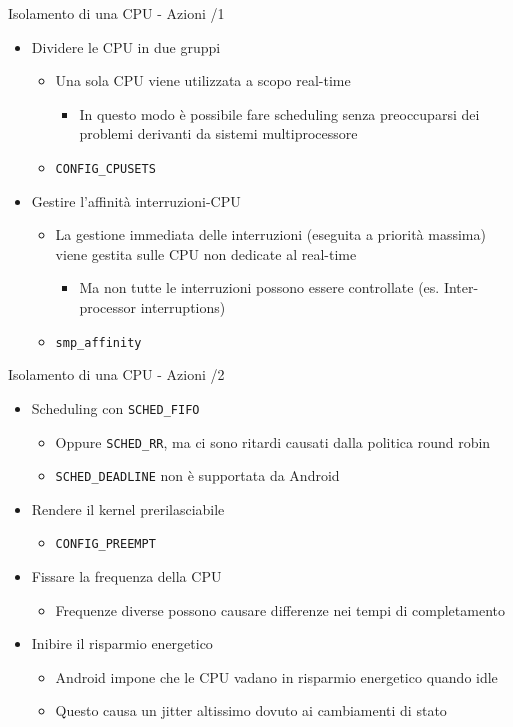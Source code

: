 \begin{frame}{Isolamento di una CPU - Azioni /1}
	\begin{itemize}
		\item Dividere le CPU in due gruppi
		\begin{itemize}
			\item Una sola CPU viene utilizzata a scopo real-time
			\begin{itemize}
				\item In questo modo è possibile fare scheduling senza preoccuparsi dei problemi derivanti da sistemi multiprocessore
			\end{itemize}
			\item \texttt{CONFIG\_CPUSETS}
		\end{itemize}
		\item Gestire l'affinità interruzioni-CPU 
		\begin{itemize}
			\item La gestione immediata delle interruzioni (eseguita a priorità massima) viene gestita sulle CPU non dedicate al real-time
			\begin{itemize}
				\item Ma non tutte le interruzioni possono essere controllate (es. Inter-processor interruptions)
			\end{itemize}
			\item \texttt{smp\_affinity}
		\end{itemize}
	\end{itemize}
\end{frame}
\begin{frame}{Isolamento di una CPU - Azioni /2}
	\begin{itemize}
		\item Scheduling con \texttt{SCHED\_FIFO}
		\begin{itemize}
			\item Oppure \texttt{SCHED\_RR}, ma ci sono ritardi causati dalla politica round robin
			\item \texttt{SCHED\_DEADLINE} non è supportata da Android
		\end{itemize}
		\item Rendere il kernel prerilasciabile 
		\begin{itemize}
			\item \texttt{CONFIG\_PREEMPT}
		\end{itemize}
		\item Fissare la frequenza della CPU
		\begin{itemize}
			\item Frequenze diverse possono causare differenze nei tempi di completamento 
		\end{itemize}
		\item Inibire il risparmio energetico
		\begin{itemize}
			\item Android impone che le CPU vadano in risparmio energetico quando idle
			\item Questo causa un jitter altissimo dovuto ai cambiamenti di stato
		\end{itemize}
	\end{itemize}
\end{frame}